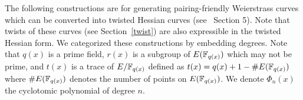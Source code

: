 The following constructions are for generating pairing-friendly Weierstrass curves
which can be converted into twisted Hessian curves (see~\cite{2015/hessian} Section 5).
Note that twists of these curves (see Section~\ref{twist}) are also expressible in the twisted Hessian form.
We categorized these constructions by embedding degrees.
Note that $q(x)$ is a prime field,
$r(x)$ is a subgroup of $E(\mathbb{F}_{q(x)})$ which may not be prime,
and $t(x)$ is a trace of $E/\mathbb{F}_{q(x)}$ defined as $t(x) = q(x) + 1 - \#E(\mathbb{F}_{q(x)})$
where $\#E(\mathbb{F}_{q(x)})$ denotes the number of points on $E(\mathbb{F}_{q(x)})$.
We denote $\Phi_{n}(x)$ the cyclotomic polynomial of degree $n$.



